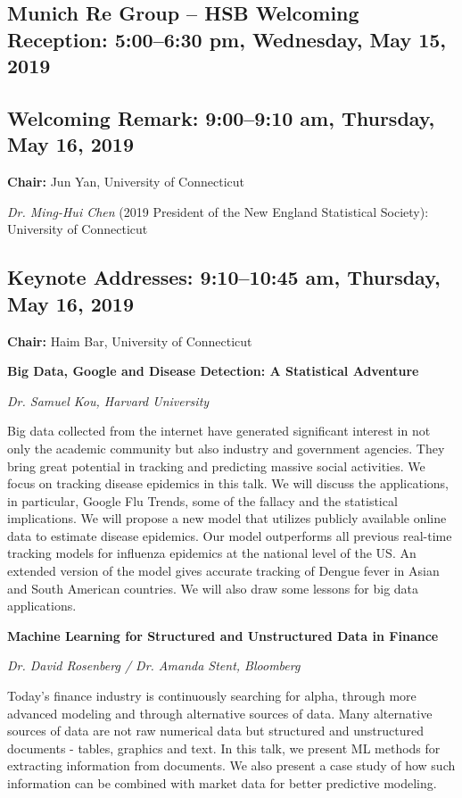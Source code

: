 \documentclass[10pt]{article}
\begin{document}
\subsection*{Munich Re Group -- HSB Welcoming Reception: \hfill
  5:00--6:30 pm, Wednesday, May 15, 2019}


\subsection*{Welcoming Remark: \hfill 9:00--9:10 am, Thursday, May 16, 2019}

{\bf Chair:} Jun Yan, University of Connecticut

\emph{Dr. Ming-Hui Chen}
(2019 President of the New England Statistical Society):
University of Connecticut

\subsection*{Keynote Addresses: \hfill 9:10--10:45 am, Thursday, May
  16, 2019}

{\bf Chair:} Haim Bar, University of Connecticut

\noindent
{\bf Big Data, Google and Disease Detection: A Statistical Adventure}

\emph{Dr. Samuel Kou, Harvard University}

Big data collected from the internet have generated significant
interest in not only the academic community but also industry and
government agencies. They bring great potential in tracking and
predicting massive social activities. We focus on tracking disease
epidemics in this talk. We will discuss the applications, in
particular, Google Flu Trends, some of the fallacy and the statistical
implications. We will propose a new model that utilizes publicly
available online data to estimate disease epidemics. Our model
outperforms all previous real-time tracking models for influenza
epidemics at the national level of the US. An extended version of the
model gives accurate tracking of Dengue fever in Asian and South
American countries. We will also draw some lessons for big data
applications.

{\bf Machine Learning for Structured and Unstructured Data in Finance}

\emph{Dr. David Rosenberg / Dr. Amanda Stent, Bloomberg}

Today's finance industry is continuously searching for alpha, through
more advanced modeling and through alternative sources of data. Many
alternative sources of data are not raw numerical data but structured
and unstructured documents - tables, graphics and text. In this talk,
we present ML methods for extracting information from documents. We
also present a case study of how such information can be combined with
market data for better predictive modeling.
\end{document}
